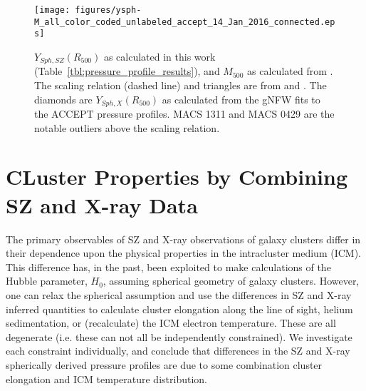 \documentclass[iop,numberedappendix,apj]{emulateapj}
\begin{document}
\begin{figure}[!ht]
  \begin{center}
  \texttt{[image: figures/ysph-M\_all\_color\_coded\_unlabeled\_accept\_14\_Jan\_2016\_connected.eps]}
  \end{center}
  \caption{$Y_{Sph,SZ}(R_{500})$ as calculated in this work (Table~\ref{tbl:pressure_profile_results}),
  and $M_{500}$ as calculated from \citet{mantz2010}. The scaling relation (dashed line) and triangles
  are from \citet{arnaud2010} and \citet{pratt2010}. The diamonds are $Y_{Sph,X}(R_{500})$ as calculated from the gNFW fits
  to the ACCEPT pressure profiles. MACS 1311 and MACS 0429 are the notable outliers above the scaling relation.}
  \label{fig:ysph_scaling}
\end{figure}

\section{CLuster Properties by Combining SZ and X-ray Data}
\label{sec:xray_comp}

The primary observables of SZ and X-ray observations of galaxy clusters differ in their 
dependence upon the physical properties in the intracluster medium (ICM). This difference
has, in the past, been exploited to make calculations of the Hubble parameter, $H_0$, 
assuming spherical geometry of galaxy clusters. However, one can relax the spherical assumption
and use the differences in SZ and X-ray inferred quantities to calculate cluster elongation
along the line of sight, helium sedimentation, or (recalculate) the ICM electron temperature.
These are all degenerate (i.e. these can not all be independently constrained). We investigate
each constraint individually, and conclude that differences in the SZ and X-ray spherically derived
pressure profiles are due to some combination cluster elongation and ICM temperature distribution.

\end{document}

